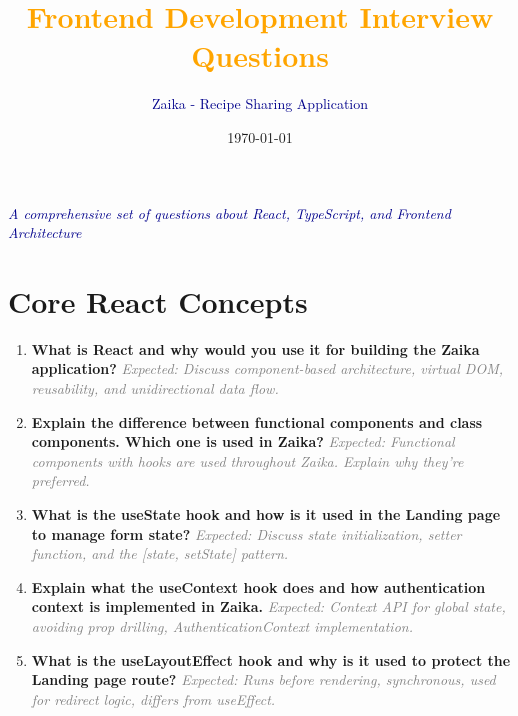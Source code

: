 \documentclass[12pt]{article}
\title{\textcolor{orange}{\textbf{Frontend Development Interview Questions}}}
\author{\textcolor{darkblue}{Zaika - Recipe Sharing Application}}
\date{\today}
\begin{document}
\maketitle

\begin{center}
\textcolor{darkblue}{\textit{A comprehensive set of questions about React, TypeScript, and Frontend Architecture}}
\end{center}

\vspace{1cm}

\section*{Core React Concepts}

\begin{enumerate}[label=\textbf{\arabic*.}, itemsep=0.5cm]

\item \textbf{What is React and why would you use it for building the Zaika application?}
\newline
\textcolor{gray}{\textit{Expected: Discuss component-based architecture, virtual DOM, reusability, and unidirectional data flow.}}

\item \textbf{Explain the difference between functional components and class components. Which one is used in Zaika?}
\newline
\textcolor{gray}{\textit{Expected: Functional components with hooks are used throughout Zaika. Explain why they're preferred.}}

\item \textbf{What is the useState hook and how is it used in the Landing page to manage form state?}
\newline
\textcolor{gray}{\textit{Expected: Discuss state initialization, setter function, and the [state, setState] pattern.}}

\item \textbf{Explain what the useContext hook does and how authentication context is implemented in Zaika.}
\newline
\textcolor{gray}{\textit{Expected: Context API for global state, avoiding prop drilling, AuthenticationContext implementation.}}

\item \textbf{What is the useLayoutEffect hook and why is it used to protect the Landing page route?}
\newline
\textcolor{gray}{\textit{Expected: Runs before rendering, synchronous, used for redirect logic, differs from useEffect.}}

\end{enumerate}
\end{document}
